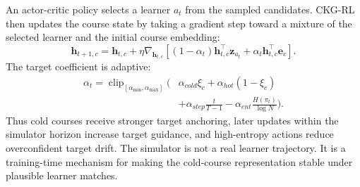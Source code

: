 \documentclass[letterpaper]{article}
\begin{document}
An actor-critic policy selects a learner \(a_t\) from the sampled candidates. CKG-RL then updates the course state by taking a gradient step toward a mixture of the selected learner and the initial course embedding:
\begin{equation}
\mathbf{h}_{t+1,c}=\mathbf{h}_{t,c}+\eta
\nabla_{\mathbf{h}_{t,c}}
\left[
(1-\alpha_t)\mathbf{h}_{t,c}^\top\mathbf{z}_{a_t}
+\alpha_t\mathbf{h}_{t,c}^\top\mathbf{e}_c
\right].
\end{equation}
The target coefficient is adaptive:
\begin{align}
\alpha_t=
\operatorname{clip}_{[\alpha_{\min},\alpha_{\max}]}\Big(
&\alpha_{cold}\xi_c+\alpha_{hot}(1-\xi_c) \nonumber\\
&+\alpha_{step}\frac{t}{T-1}
-\alpha_{ent}\frac{H(\pi_t)}{\log N}
\Big).
\end{align}
Thus cold courses receive stronger target anchoring, later updates within the simulator horizon increase target guidance, and high-entropy actions reduce overconfident target drift. The simulator is not a real learner trajectory. It is a training-time mechanism for making the cold-course representation stable under plausible learner matches.
\end{document}
